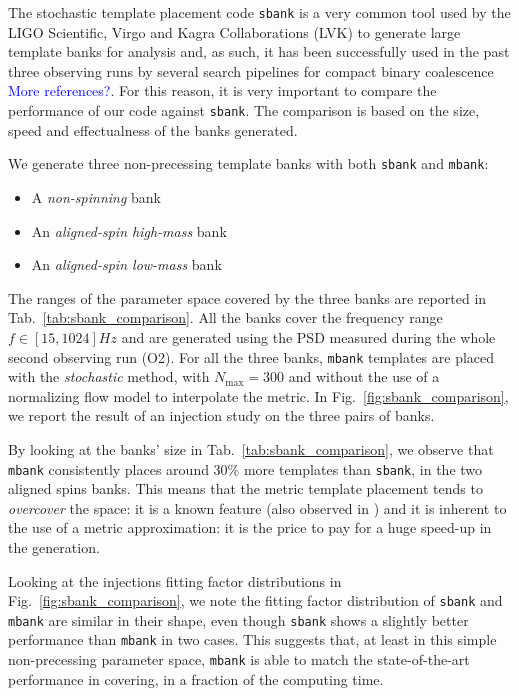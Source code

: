 \documentclass[twocolumn,showpacs,preprintnumbers,nofootinbib,prd,
superscriptaddress,10pt]{revtex4-2}
\begin{document}
The stochastic template placement code \texttt{sbank} \cite{Ajith:2012mn} is a very common tool used by the LIGO Scientific, Virgo and Kagra Collaborations (LVK) to generate large template banks for analysis and, as such, it has been successfully used in the past three observing runs by several search pipelines for compact binary coalescence \cite{Usman:2015kfa, Mukherjee:2018yra, Aubin:2020goo} \textcolor{blue}{More references?}.
For this reason, it is very important to compare the performance of our code against \texttt{sbank}. The comparison is based on the size, speed and effectualness of the banks generated.

We generate three non-precessing template banks with both \texttt{sbank} and \texttt{mbank}:
\begin{itemize}
	\item A {\it non-spinning} bank
	\item An {\it aligned-spin high-mass} bank
	\item An {\it aligned-spin low-mass} bank
\end{itemize}
The ranges of the parameter space covered by the three banks are reported in Tab.~\ref{tab:sbank_comparison}. All the banks cover the frequency range $f\in [15,1024] Hz$ and are generated using the PSD measured during the whole second observing run (O2).
For all the three banks, \texttt{mbank} templates are placed with the {\it stochastic} method, with $N_\text{max}=300$ and without the use of a normalizing flow model to interpolate the metric. In Fig.~\ref{fig:sbank_comparison}, we report the result of an injection study on the three pairs of banks.

By looking at the banks' size in Tab.~\ref{tab:sbank_comparison}, we observe that \texttt{mbank} consistently places around 30\% more templates than \texttt{sbank}, in the two aligned spins banks. This means that the metric template placement tends to \textit{overcover} the space: it is a known feature (also observed in \cite{Coogan:2022qxs}) and it is inherent to the use of a metric approximation: it is the price to pay for a huge speed-up in the generation.

Looking at the injections fitting factor distributions in Fig.~\ref{fig:sbank_comparison}, we note the fitting factor distribution of \texttt{sbank} and \texttt{mbank} are similar in their shape, even though \texttt{sbank} shows a slightly better performance than \texttt{mbank} in two cases. This suggests that, at least in this simple non-precessing parameter space, \texttt{mbank} is able to match the state-of-the-art performance in covering, in a fraction of the computing time.
\end{document}
